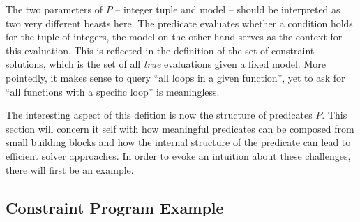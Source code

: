     The two parameters of $P$ -- integer tuple and model -- should be
    interpreted as two very different beasts here.
    The predicate evaluates whether a condition holds for the tuple of integers,
    the model on the other hand serves as the context for this evaluation.
    This is reflected in the definition of the set of constraint solutions,
    which is the set of all {\em true} evaluations given a fixed model.
    More pointedly, it makes sense to query ``all loops in a given function'',
    yet to ask for ``all functions with a specific loop'' is meaningless.

    The interesting aspect of this defition is now the structure of predicates
    $P$.
    This section will concern it self with how meaningful predicates can be
    composed from small building blocks and how the internal structure of the
    predicate can lead to efficient solver approaches.
    In order to evoke an intuition about these challenges, there will first be
    an example.

\subsection{Constraint Program Example}

